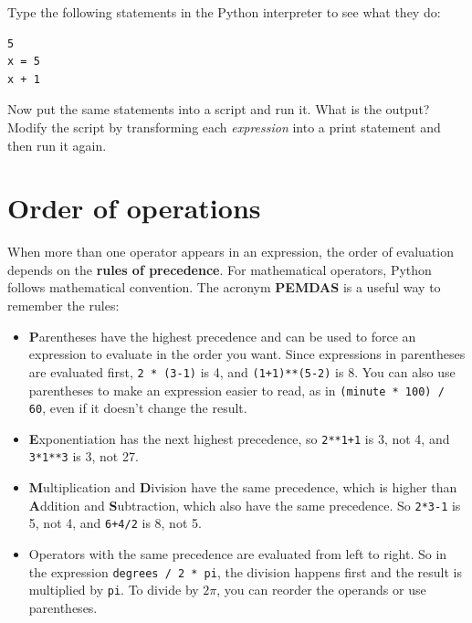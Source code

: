 \documentclass[10pt]{book}
\begin{document}
\begin{ex}
Type the following statements in the Python interpreter to see
what they do:

\beforeverb
\begin{verbatim}
5
x = 5
x + 1
\end{verbatim}
\afterverb
%
Now put the same statements into a script and run it.  What
is the output?  Modify the script by transforming each
{\em expression} into a print statement and then run it again.
\end{ex}


\section{Order of operations}

When more than one operator appears in an expression, the order of
evaluation depends on the {\bf rules of precedence}.  For
mathematical operators, Python follows mathematical convention.
The acronym {\bf PEMDAS} is a useful way to
remember the rules:


\begin{itemize}

\item {\bf P}arentheses have the highest precedence and can be used 
to force an expression to evaluate in the order you want. Since
expressions in parentheses are evaluated first, {\tt 2 * (3-1)} is 4,
and {\tt (1+1)**(5-2)} is 8. You can also use parentheses to make an
expression easier to read, as in {\tt (minute * 100) / 60}, even
if it doesn't change the result.

\item {\bf E}xponentiation has the next highest precedence, so
{\tt 2**1+1} is 3, not 4, and {\tt 3*1**3} is 3, not 27.

\item {\bf M}ultiplication and {\bf D}ivision have the same precedence,
which is higher than {\bf A}ddition and {\bf S}ubtraction, which also
have the same precedence.  So {\tt 2*3-1} is 5, not 4, and
{\tt 6+4/2} is 8, not 5.

\item Operators with the same precedence are evaluated from left to 
right.  So in the expression {\tt degrees / 2 * pi}, the division
happens first and the result is multiplied by {\tt pi}.  
To divide by $2 \pi$, you can reorder the operands or use parentheses.

\end{itemize}
\end{document}
